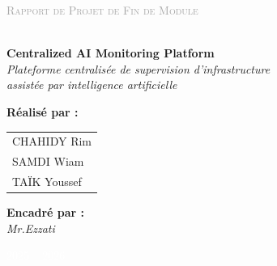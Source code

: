 \begin{titlepage}
\vspace{0.5cm}
\begin{center}
  \textcolor{DarkGray}{\normalsize\scshape Rapport de Projet de Fin de Module}\\[10pt]
  \\[10pt]
  {\fontsize{20}{26}\bfseries\color{NavyBlue} Centralized AI Monitoring Platform}\\[5pt]
  {\normalsize\color{DarkGray}\itshape
    Plateforme centralisée de supervision d'infrastructure\\
    assistée par intelligence artificielle}\\[8pt]
\end{center}

\vspace{1.0cm}

\begin{minipage}[t]{0.48\textwidth}
  \textcolor{NavyBlue}{\bfseries Réalisé par :}\\[6pt]
  \begin{tabular}{@{}l}
    CHAHIDY Rim \\
    SAMDI Wiam  \\
    TAÏK Youssef
  \end{tabular}
\end{minipage}
\hfill
\begin{minipage}[t]{0.48\textwidth}
  \raggedleft
  \textcolor{NavyBlue}{\bfseries Encadré par :}\\[6pt]
  \textit{Mr.Ezzati}\\[14pt]
  
\end{minipage}

\vfill
\begin{center}
  \textcolor{white}{\small 2025 -- 2026}
\end{center}

\end{titlepage}
